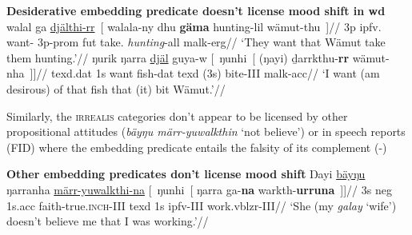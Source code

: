 \pex \textbf{Desiderative embedding predicate doesn't license mood shift in \gls{wd}}
\a\begingl\gla walal ga \ul{djälthi-rr}~\textup{[} walala-ny dhu \textbf{gäma} hunting-lil wämut-thu\textup{~]}//
\glb 3p \gls{ipfv}.\I{} want-\I{} 3p-\gls{prom} \gls{fut} take.\I{} \textit{hunting}-\gls{all} \gls{malk}-\gls{erg}//
\glft`They want that Wämut take them hunting.'//\endgl
\a\begingl\gla ŋurik ŋarra \ul{djäl} guya-w \textup{[}~ŋunhi~\textup{[} (ŋayi)  ḏarrkthu-\textbf{rr} wämut-nha\textup{~]]}//
\glb \gls{texd}.\gls{dat} 1s want fish-\gls{dat} \gls{texd} (3s) bite-\gls{III} \gls{malk}-\gls{acc}//
\glft`I want (am desirous) of that fish that (it) bit Wämut.'//\endgl
\xe

Similarly, the \textsc{irrealis} categories don't appear to be licensed by other propositional attitudes (\textit{bäyŋu märr-yuwalkthin} `not believe') or in speech reports (FID) where the embedding predicate entails the falsity of its complement (-)

\pex \textbf{Other embedding predicates don't license mood shift}
\a\begingl\gla Ŋayi \ul{bäyŋu} ŋarranha \ul{märr-yuwalkthi-na} \textup[~ŋunhi~\textup[  ŋarra ga-\textbf{na} warkth-\textbf{urruna}\textup{~]]}//
\glb 3s \gls{neg} 1s.\gls{acc} faith-true.\textsc{inch}-\gls{III} \gls{texd} 1s \gls{ipfv}-\gls{III} work.\gls{vblzr}-\gls{III}//
\glft`She (my \textit{galay} `wife') doesn't believe me that I was working.'\trailingcitation{[DhG~20190417]}//\endgl

